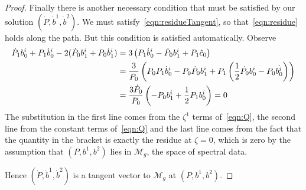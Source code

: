 \documentclass{article}
\begin{document}
\begin{lem}[Case (a)]
\begin{proof}
Finally there is another necessary condition that must be satisfied by our solution $(\dot{P},\dot{b}^1,\dot{b}^2)$. We must satisfy~\eqref{eqn:residueTangent}, so that~\eqref{eqn:residue} holds along the path. But this condition is satisfied automatically. Observe
\begin{align*}
\dot{P}_1 b^i_0 + P_1 \dot{b}^i_0 - 2(\dot{P}_0 b^i_1 + P_0 \dot{b}^i_1)
&= 3\left( P_1\dot{b}^i_0 - \dot{P}_0b^i_1 + P_1\hat{c}_0\right) \\
&= \frac{3}{P_0}\left( P_0P_1\dot{b}^i_0 - P_0\dot{P}_0b^i_1 + P_1\left( \frac{1}{2}\dot{P_0}b^i_0 - P_0\dot{b^i_0} \right)\right) \\
&= \frac{3\dot{P}_0}{P_0}\left( - P_0b^i_1 + \frac{1}{2}P_1b^i_0 \right)
= 0
\end{align*}
The substitution in the first line comes from the $\zeta^1$ terms of~\eqref{eqn:Q}, the second line from the constant terms of~\eqref{eqn:Q} and the last line comes from the fact that the quantity in the bracket is exactly the residue at $\zeta=0$, which is zero by the assumption that $(P,b^1,b^2)$ lies in $\mathcal{M}_g$, the space of spectral data.

Hence $(\dot{P},\dot{b}^1,\dot{b}^2)$ is a tangent vector to $\mathcal{M}_g$ at $(P,b^1,b^2)$.
\end{proof}
\end{lem}
\end{document}
